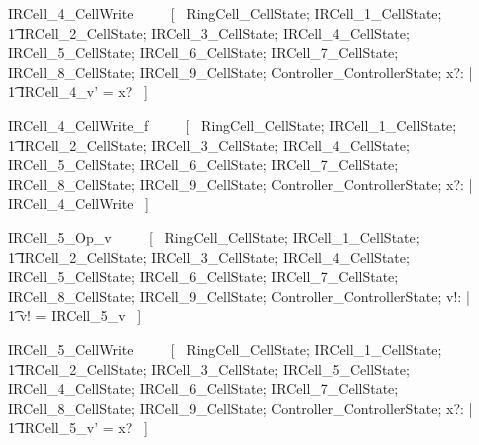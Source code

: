 \documentclass{article}
\begin{document}
\begin{zed}
IRCell\_4\_CellWrite ~~~~ [~ 
    \Xi RingCell\_CellState; 
    \Xi IRCell\_1\_CellState; \\
    \t1 \Xi IRCell\_2\_CellState; 
    \Xi IRCell\_3\_CellState; 
    \Delta IRCell\_4\_CellState;
    \Xi IRCell\_5\_CellState; 
    \Xi IRCell\_6\_CellState; 
    \Xi IRCell\_7\_CellState; 
    \Xi IRCell\_8\_CellState; 
    \Xi IRCell\_9\_CellState; 
    \Xi Controller\_ControllerState; 
    x?: \nat | \\
    \t1 IRCell\_4\_v' = x? ~] \\
\end{zed}

\begin{zed}
IRCell\_4\_CellWrite\_f ~~~~ [~ 
    \Xi RingCell\_CellState; 
    \Xi IRCell\_1\_CellState; \\
    \t1 \Xi IRCell\_2\_CellState; 
    \Xi IRCell\_3\_CellState;
    \Xi IRCell\_4\_CellState; 
    \Xi IRCell\_5\_CellState; 
    \Xi IRCell\_6\_CellState; 
    \Xi IRCell\_7\_CellState; 
    \Xi IRCell\_8\_CellState; 
    \Xi IRCell\_9\_CellState; 
    \Xi Controller\_ControllerState; 
    x?: \nat | \\
    \lnot \pre IRCell\_4\_CellWrite ~] \\
\end{zed}
\begin{zed}
IRCell\_5\_Op\_v ~~~~ [~ 
    \Xi RingCell\_CellState; 
    \Xi IRCell\_1\_CellState; \\
    \t1 \Xi IRCell\_2\_CellState; 
    \Xi IRCell\_3\_CellState;
    \Xi IRCell\_4\_CellState; 
    \Xi IRCell\_5\_CellState; 
    \Xi IRCell\_6\_CellState; 
    \Xi IRCell\_7\_CellState; 
    \Xi IRCell\_8\_CellState; 
    \Xi IRCell\_9\_CellState; 
    \Xi Controller\_ControllerState; v!: \nat | \\
    \t1 v! = IRCell\_5\_v ~] \\
\end{zed}

\begin{zed}
IRCell\_5\_CellWrite ~~~~ [~ 
    \Xi RingCell\_CellState; 
    \Xi IRCell\_1\_CellState; \\
    \t1 \Xi IRCell\_2\_CellState; 
    \Xi IRCell\_3\_CellState; 
    \Delta IRCell\_5\_CellState;
    \Xi IRCell\_4\_CellState; 
    \Xi IRCell\_6\_CellState; 
    \Xi IRCell\_7\_CellState; 
    \Xi IRCell\_8\_CellState; 
    \Xi IRCell\_9\_CellState; 
    \Xi Controller\_ControllerState; 
    x?: \nat | \\
    \t1 IRCell\_5\_v' = x? ~] \\
\end{zed}
\end{document}
